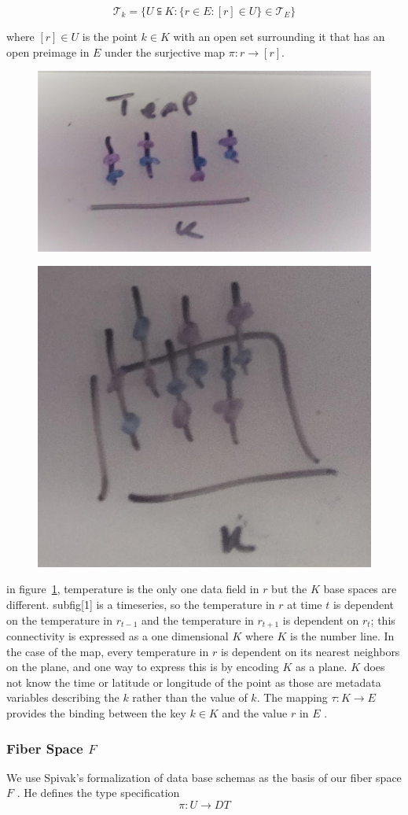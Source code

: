\documentclass[../main.tex]{subfiles}
\begin{document}
\begin{equation}
\mathcal{T}_k = \{U\subseteqq K: \{r \in E: [r] \in U\}\in \mathcal{T}_E\}
\end{equation}

where $[r] \in U$ is the point $k \in K$ with an open set surrounding it that has an open preimage in $E$ under the surjective map $\pi: r \rightarrow [r]$. 



\begin{figure}[ht]
    \includegraphics[width=0.2\linewidth]{figures/sections/math/temp_1k.png}
    \label{fig:k_data}
\end{figure}

\begin{figure}[ht]
    \includegraphics[width=0.2\linewidth]{figures/sections/math/temp_2k.png}
\end{figure}

in figure~\ref{fig:k_data}, temperature is the only one data field in $r$ but the $K$ base spaces are different. subfig[1] is a timeseries, so the temperature in $r$ at time $t$ is dependent on the temperature in $r_{t-1}$ and the temperature in $r_{t+1}$ is dependent on  $r_t$; this connectivity is expressed as a one dimensional $K$ where $K$ is the number line. In the case of the map, every temperature in $r$ is dependent on its nearest neighbors on the plane, and one way to express this is by encoding $K$ as a plane. $K$ does not know the time or latitude or longitude of the point as those are metadata variables describing the $k$ rather than the value of $k$. The mapping $\tau: K \rightarrow E$ provides the binding between the key $k \in K$ and the value $r$ in $E$ \cite{munznerChDataAbstraction}.

\subsubsection{Fiber Space $F$}
We use Spivak's formalization of data base schemas as the basis of our fiber space $F$ \cite{spivakSIMPLICIALDATABASES}. He defines the type specification 
\begin{equation}
\pi: U \rightarrow DT
\end{equation}
\end{document}
